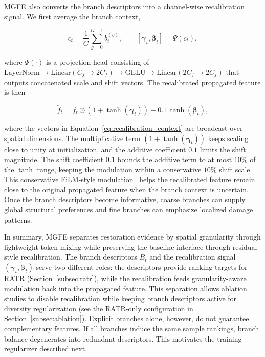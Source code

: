 MGFE also converts the branch descriptors into a channel-wise recalibration signal. We first average the branch context,

\begin{equation}
c_t = \frac{1}{G}\sum_{g=0}^{G-1}b_t^{(g)},
\qquad
[\boldsymbol{\gamma}_t,\boldsymbol{\beta}_t] = \Psi(c_t),
\label{eq:recalibration_context}
\end{equation}

where $\Psi(\cdot)$ is a projection head consisting of $\mathrm{LayerNorm}\!\rightarrow\!\mathrm{Linear}(C_f\!\rightarrow\!2C_f)\!\rightarrow\!\mathrm{GELU}\!\rightarrow\!\mathrm{Linear}(2C_f\!\rightarrow\!2C_f)$ that outputs concatenated scale and shift vectors. The recalibrated propagated feature is then

\begin{equation}
\widetilde{f}_t =
f_t \odot
\left(1+\tanh(\boldsymbol{\gamma}_t)\right)
+ 0.1\,\tanh(\boldsymbol{\beta}_t),
\label{eq:recalibration}
\end{equation}

where the vectors in Equation~\eqref{eq:recalibration_context} are broadcast over spatial dimensions. The multiplicative term $(1+\tanh(\boldsymbol{\gamma}_t))$ keeps scaling close to unity at initialization, and the additive coefficient $0.1$ limits the shift magnitude. The shift coefficient $0.1$ bounds the additive term to at most $10\%$ of the $\tanh$ range, keeping the modulation within a conservative $10\%$ shift scale. This conservative FiLM-style modulation~\cite{perez2018film} helps the recalibrated feature remain close to the original propagated feature when the branch context is uncertain. Once the branch descriptors become informative, coarse branches can supply global structural preferences and fine branches can emphasize localized damage patterns.

In summary, MGFE separates restoration evidence by spatial granularity through lightweight token mixing while preserving the baseline interface through residual-style recalibration. The branch descriptors $B_t$ and the recalibration signal $(\boldsymbol{\gamma}_t, \boldsymbol{\beta}_t)$ serve two different roles: the descriptors provide ranking targets for RATR (Section~\ref{subsec:ratr}), while the recalibration feeds granularity-aware modulation back into the propagated feature. This separation allows ablation studies to disable recalibration while keeping branch descriptors active for diversity regularization (see the RATR-only configuration in Section~\ref{subsec:ablation}). Explicit branches alone, however, do not guarantee complementary features. If all branches induce the same sample rankings, branch balance degenerates into redundant descriptors. This motivates the training regularizer described next.

